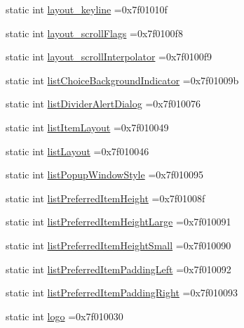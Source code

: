 \begin{DoxyCompactItemize}
\item 
static int \hyperlink{classandroid_1_1support_1_1design_1_1R_1_1attr_a8232f78f637dacb005523bdcf8264c99}{layout\+\_\+keyline} =0x7f01010f
\item 
static int \hyperlink{classandroid_1_1support_1_1design_1_1R_1_1attr_ac74bc2945ca7301db9b32f08c4454a7d}{layout\+\_\+scroll\+Flags} =0x7f0100f8
\item 
static int \hyperlink{classandroid_1_1support_1_1design_1_1R_1_1attr_ac4c1f8078558d24685155a3802d0746f}{layout\+\_\+scroll\+Interpolator} =0x7f0100f9
\item 
static int \hyperlink{classandroid_1_1support_1_1design_1_1R_1_1attr_a95c2e375c8509ef7555a7d818d499bfd}{list\+Choice\+Background\+Indicator} =0x7f01009b
\item 
static int \hyperlink{classandroid_1_1support_1_1design_1_1R_1_1attr_ae516939c27295fc709337c4f1d415514}{list\+Divider\+Alert\+Dialog} =0x7f010076
\item 
static int \hyperlink{classandroid_1_1support_1_1design_1_1R_1_1attr_ad63c63d279d12a0e639383746d24e4fd}{list\+Item\+Layout} =0x7f010049
\item 
static int \hyperlink{classandroid_1_1support_1_1design_1_1R_1_1attr_abdf7b3a668401dcc8dfa7dc72c880f11}{list\+Layout} =0x7f010046
\item 
static int \hyperlink{classandroid_1_1support_1_1design_1_1R_1_1attr_ae687e51c2385efa82cabc4c678ebcdd5}{list\+Popup\+Window\+Style} =0x7f010095
\item 
static int \hyperlink{classandroid_1_1support_1_1design_1_1R_1_1attr_afd914d37ccd3774be092e75022f888ee}{list\+Preferred\+Item\+Height} =0x7f01008f
\item 
static int \hyperlink{classandroid_1_1support_1_1design_1_1R_1_1attr_a3adf33dcb6fd984d1d7aee11e167ba4b}{list\+Preferred\+Item\+Height\+Large} =0x7f010091
\item 
static int \hyperlink{classandroid_1_1support_1_1design_1_1R_1_1attr_a8e453f1de1f5bad7dd2c255116542ce2}{list\+Preferred\+Item\+Height\+Small} =0x7f010090
\item 
static int \hyperlink{classandroid_1_1support_1_1design_1_1R_1_1attr_a8f6dc9aede7141a5cd6d4242cdb5cf80}{list\+Preferred\+Item\+Padding\+Left} =0x7f010092
\item 
static int \hyperlink{classandroid_1_1support_1_1design_1_1R_1_1attr_a35b15db2513263f58557a28063e21a25}{list\+Preferred\+Item\+Padding\+Right} =0x7f010093
\item 
static int \hyperlink{classandroid_1_1support_1_1design_1_1R_1_1attr_a71cd4cca1c1a2d4a719434831f5e0c6d}{logo} =0x7f010030

\end{DoxyCompactItemize}
